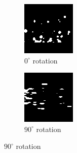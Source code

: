 \documentclass[10pt,twocolumn,letterpaper]{article}
\begin{document}
\begin{figure}[H]
  \centering
  \begin{subfigure}{.33\linewidth}
    \includegraphics[width=\linewidth]{img_aug}
    \caption{$0^\circ$ rotation}
    \label{fig:img_aug_0}
  \end{subfigure}
  \qquad
  \begin{subfigure}{0.33\linewidth}
    \includegraphics[width=\linewidth]{img_aug_rot_90}
    \caption{$90^\circ$ rotation}
    \label{fig:img_aug_90}
  \end{subfigure}
  

\end{figure}
\end{document}
